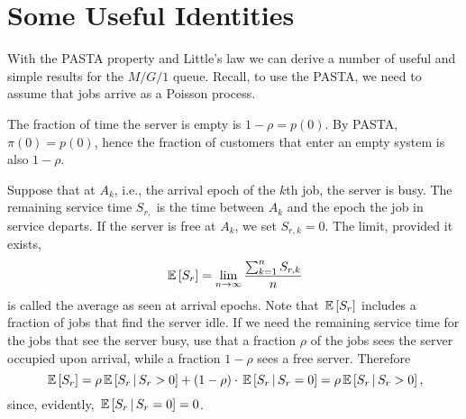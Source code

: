 \section{Some Useful Identities}\label{sec:some-usef-ident}

With the PASTA property and Little's law we can derive a number of
useful and simple results for the $M/G/1$ queue. Recall, to use the
PASTA, we need to assume that jobs arrive as a Poisson process.

The fraction of time the server is empty is $1-\rho = p(0)$. By PASTA,
$\pi(0)=p(0)$, hence the fraction of customers that enter an empty
system is also $1-\rho$. 

Suppose that at $A_k$, i.e., the arrival epoch of the $k$th job, the
server is busy.  The remaining service time $S_{r,}$ is the
time between $A_k$ and the epoch the job in service departs. If the
server is free at $A_k$, we set $S_{r,k}=0$.  The limit, provided it exists, 
\begin{equation*}
  \,\mathbb{E}\left[S_r\right] = \lim_{n\to\infty} \frac{\sum_{k=1}^n S_{r,k}}{n}
\end{equation*}
is called the average  as seen at
arrival epochs.  Note that $\,\mathbb{E}\left[S_r\right]$ includes a fraction of jobs that
find the server idle. If we need the remaining service time for the
jobs that see the server busy, use that a fraction $\rho$ of the jobs
sees the server occupied upon arrival, while a fraction $1-\rho$ sees
a free server. Therefore
\begin{equation}\label{eq:37}
\,\mathbb{E}\left[S_r\right] =   \rho \,\mathbb{E}\left[S_r\,\middle|\, S_r >0\right] + (1-\rho)\cdot \,\mathbb{E}\left[S_r\,\middle|\, S_r = 0\right] = \rho \,\mathbb{E}\left[S_r\,\middle|\, S_r>0\right],
\end{equation}
since, evidently, $\,\mathbb{E}\left[S_r\,\middle|\, S_r=0\right]=0$. 

